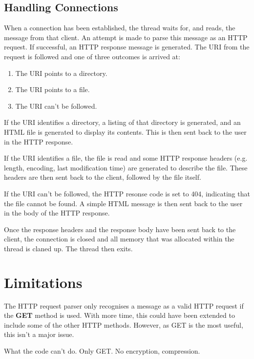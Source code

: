\documentclass[a4paper]{article}
\begin{document}
\subsection{Handling Connections}
When a connection has been established, the thread waits for, and reads, the
message from that client. An attempt is made to parse this message as an HTTP
request. If successful, an HTTP response message is generated. The URI from the
request is followed and one of three outcomes is arrived at:

\begin{enumerate}
\item The URI points to a directory.
\item The URI points to a file.
\item The URI can't be followed.
\end{enumerate}

If the URI identifies a directory, a listing of that directory is generated, and
an HTML file is generated to display its contents. This is then sent back to the
user in the HTTP response.

If the URI identifies a file, the file is read and some HTTP response headers
(e.g. length, encoding, last modification time) are generated to describe the
file. These headers are then sent back to the client, followed by the file
itself.

If the URI can't be followed, the HTTP resonse code is set to 404, indicating
that the file cannot be found. A simple HTML message is then sent back to the
user in the body of the HTTP response.

Once the response headers and the response body have been sent back to the
client, the connection is closed and all memory that was allocated within the
thread is claned up. The thread then exits.

\section{Limitations}
The HTTP request parser only recognises a message as a valid HTTP request if the
\textbf{GET} method is used. With more time, this could have been extended to
include some of the other HTTP methods. However, as GET is the most useful, this
isn't a major issue.



What the code can't do.
Only GET. No encryption, compression.
\end{document}
